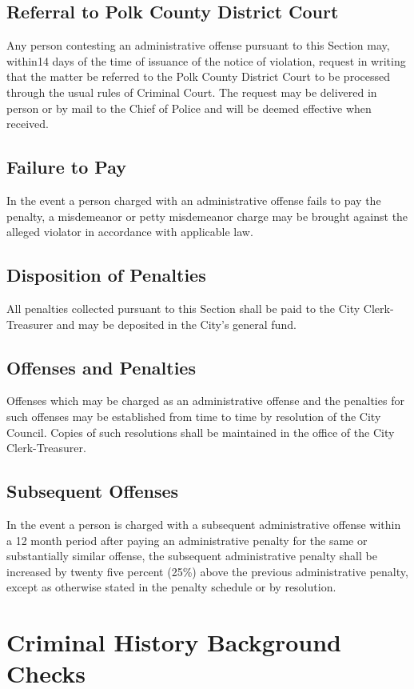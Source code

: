 \subsection{Referral to Polk County District Court}
Any person contesting an administrative offense pursuant to this Section may, within14 days of the time of issuance of the notice of violation, request in writing that the matter be referred to the Polk County District Court to be processed through the usual rules of Criminal Court. The request may be delivered in person or by mail to the Chief of Police and will be deemed effective when received.
\subsection{Failure to Pay}
In the event a person charged with an administrative offense fails to pay the penalty, a misdemeanor or petty misdemeanor charge may be brought against the alleged violator in accordance with applicable law.
\subsection{Disposition of Penalties}
All penalties collected pursuant to this Section shall be paid to the City Clerk-Treasurer and may be deposited in the City’s general fund.
\subsection{Offenses and Penalties}
Offenses which may be charged as an administrative offense and the penalties for such offenses may be established from time to time by resolution of the City Council. Copies of such resolutions shall be maintained in the office of the City Clerk-Treasurer.
\subsection{Subsequent Offenses}
In the event a person is charged with a subsequent administrative offense within a 12 month period after paying an administrative penalty for the same or substantially similar offense, the subsequent administrative penalty shall be increased by twenty five percent (25\%) above the previous administrative penalty, except as otherwise stated in the penalty schedule or by resolution.

\section{Criminal History Background Checks}

